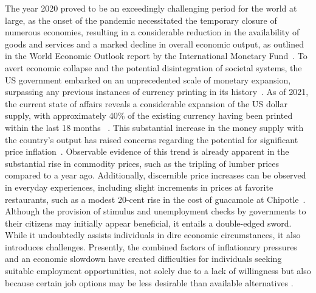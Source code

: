 The year 2020 proved to be an exceedingly challenging period for the world at large, as the onset of the pandemic
necessitated the temporary closure of numerous economies, resulting in a considerable reduction in the availability of
goods and services and a marked decline in overall economic output, as outlined in the World Economic Outlook report by
the International Monetary Fund~\cite{imf2020}. To avert economic collapse and the potential disintegration of societal
systems, the US government embarked on an unprecedented scale of monetary expansion, surpassing any previous instances
of currency printing in its history~\cite{blinder2020}. As of 2021, the current state of affairs reveals a considerable
expansion of the US dollar supply, with approximately 40\% of the existing currency having been printed within the last
18 months ~\cite{fedmoneysupply}. This substantial increase in the money supply with the country's output has raised
concerns regarding the potential for significant price inflation~\cite{Blanchard2021}. Observable evidence of this trend
is already apparent in the substantial rise in commodity prices, such as the tripling of lumber prices compared to a
year ago. Additionally, discernible price increases can be observed in everyday experiences, including slight increments
in prices at favorite restaurants, such as a modest 20-cent rise in the cost of guacamole at Chipotle~\cite{BLS}.
Although the provision of stimulus and unemployment checks by governments to their citizens may initially appear
beneficial, it entails a double-edged sword. While it undoubtedly assists individuals in dire economic circumstances, it
also introduces challenges. Presently, the combined factors of inflationary pressures and an economic slowdown have
created difficulties for individuals seeking suitable employment opportunities, not solely due to a lack of willingness
but also because certain job options may be less desirable than available alternatives \cite{cbo2020, kahn2020}.

